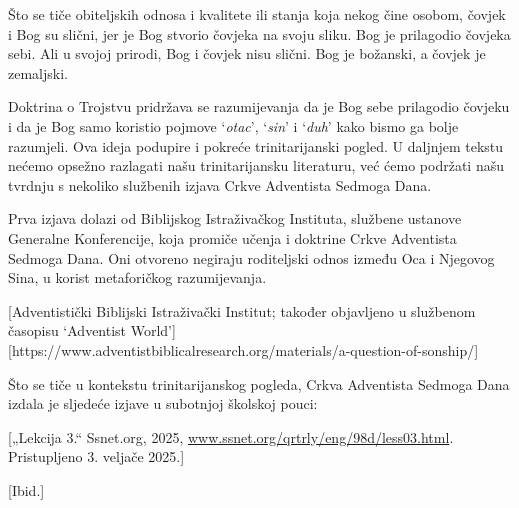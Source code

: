 Što se tiče obiteljskih odnosa i kvalitete ili stanja koja nekog čine osobom, čovjek i Bog su slični, jer je Bog stvorio čovjeka na svoju sliku. Bog je prilagodio čovjeka sebi. Ali u svojoj prirodi, Bog i čovjek nisu slični. Bog je božanski, a čovjek je zemaljski.

Doktrina o Trojstvu pridržava se razumijevanja da je Bog sebe prilagodio čovjeku i da je Bog samo koristio pojmove ‘\textit{otac}’, ‘\textit{sin}’ i ‘\textit{duh}’ kako bismo ga bolje razumjeli. Ova ideja podupire i pokreće trinitarijanski pogled. U daljnjem tekstu nećemo opsežno razlagati našu trinitarijansku literaturu, već ćemo podržati našu tvrdnju s nekoliko službenih izjava Crkve Adventista Sedmoga Dana.

Prva izjava dolazi od Biblijskog Istraživačkog Instituta, službene ustanove Generalne Konferencije, koja promiče učenja i doktrine Crkve Adventista Sedmoga Dana. Oni otvoreno negiraju roditeljski odnos između Oca i Njegovog Sina, u korist metaforičkog razumijevanja.

[Adventistički Biblijski Istraživački Institut; također objavljeno u službenom časopisu ‘Adventist World’][https://www.adventistbiblicalresearch.org/materials/a-question-of-sonship/]

Što se tiče  u kontekstu trinitarijanskog pogleda, Crkva Adventista Sedmoga Dana izdala je sljedeće izjave u subotnjoj školskoj pouci:

[„Lekcija 3.“ Ssnet.org, 2025, \href{http://www.ssnet.org/qrtrly/eng/98d/less03.html}{www.ssnet.org/qrtrly/eng/98d/less03.html}. Pristupljeno 3. veljače 2025.]

[Ibid.]

